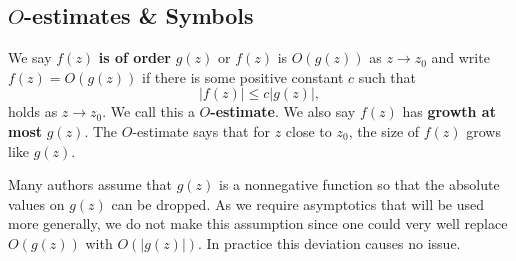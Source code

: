       \subsection*{\texorpdfstring{$O$}{O}-estimates \& Symbols}
        We say $f(z)$ \textbf{is of order} $g(z)$ or $f(z)$ is $O(g(z))$ as $z \to z_{0}$ and write $f(z) = O(g(z))$
        if there is some positive constant $c$ such that
        \[
          |f(z)| \le c|g(z)|,
        \]
        holds as $z \to z_{0}$. We call this a \textbf{$O$-estimate}. We also say $f(z)$ has \textbf{growth at most} $g(z)$. The $O$-estimate says that for $z$ close to $z_{0}$, the size of $f(z)$ grows like $g(z)$.
        
        \begin{remark}
          Many authors assume that $g(z)$ is a nonnegative function so that the absolute values on $g(z)$ can be dropped. As we require asymptotics that will be used more generally, we do not make this assumption since one could very well replace $O(g(z))$ with $O(|g(z)|)$. In practice this deviation causes no issue.
        \end{remark}
        
